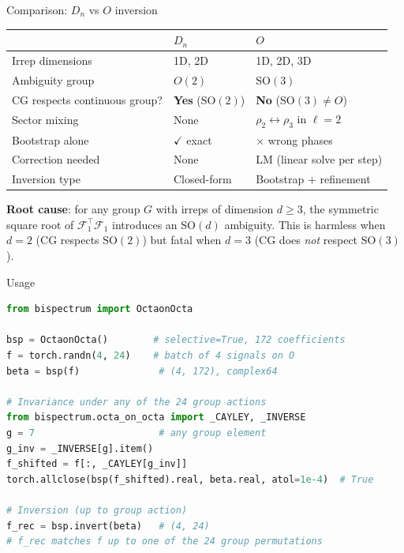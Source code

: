 \documentclass[aspectratio=169]{beamer}
\begin{document}
\begin{frame}{Comparison: $D_n$ vs $O$ inversion}
  \begin{table}
    \begin{tabular}{lll}
      \toprule
      & \textbf{$D_n$} & \textbf{$O$} \\
      \midrule
      Irrep dimensions & 1D, 2D & 1D, 2D, 3D \\
      Ambiguity group & $O(2)$ & $\mathrm{SO}(3)$ \\
      CG respects continuous group? & \textbf{Yes} ($\mathrm{SO}(2)$) & \textbf{No} ($\mathrm{SO}(3) \neq O$) \\
      Sector mixing & None & $\rho_2 \leftrightarrow \rho_3$ in $\ell{=}2$ \\
      Bootstrap alone & $\checkmark$ exact & $\times$ wrong phases \\
      Correction needed & None & LM (linear solve per step) \\
      Inversion type & Closed-form & Bootstrap + refinement \\
      \bottomrule
    \end{tabular}
  \end{table}

  \bigskip

  \textbf{Root cause}: for any group $G$ with irreps of dimension $d \geq 3$,
  the symmetric square root of $\mathcal{F}_1^\top \mathcal{F}_1$ introduces an
  $\mathrm{SO}(d)$ ambiguity. This is harmless when $d = 2$ (CG respects $\mathrm{SO}(2)$)
  but fatal when $d = 3$ (CG does \emph{not} respect $\mathrm{SO}(3)$).
\end{frame}

\begin{frame}[fragile]{Usage}
\begin{lstlisting}[language=Python]
from bispectrum import OctaonOcta

bsp = OctaonOcta()        # selective=True, 172 coefficients
f = torch.randn(4, 24)    # batch of 4 signals on O
beta = bsp(f)              # (4, 172), complex64

# Invariance under any of the 24 group actions
from bispectrum.octa_on_octa import _CAYLEY, _INVERSE
g = 7                      # any group element
g_inv = _INVERSE[g].item()
f_shifted = f[:, _CAYLEY[g_inv]]
torch.allclose(bsp(f_shifted).real, beta.real, atol=1e-4)  # True

# Inversion (up to group action)
f_rec = bsp.invert(beta)   # (4, 24)
# f_rec matches f up to one of the 24 group permutations
\end{lstlisting}
\end{frame}
\end{document}
